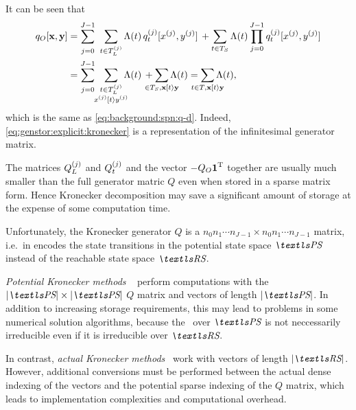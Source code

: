 It can be seen that
\begin{align}
  q_O[\vec{x}, \vec{y}]
  &= \sum_{\vphantom{\loc{T_L}{j}}j = 0}^{J - 1} \,\, \sum_{t \in
    \loc{T_L}{j}} \Lambda(t) \,
    \loc{q_t}{j}[\loc{x}{j}, \loc{y}{j}] \, + \sum_{t \in T_S} \Lambda(t)
    \prod_{\vphantom{T_S}j = 0}^{J - 1}
    \loc{q_t}{j}[\loc{x}{j}, \loc{y}{j}] \\
  &= \sum_{\vphantom{\loc{T_L}{j}}j = 0}^{J - 1} \,\,
    \sum_{\substack{\vphantom{\loc{T_L}{j}}t \in \loc{T_L}{j} \\
  \mathclap{\loc{x}{j} \tranto{t} \loc{y}{j}}}} \Lambda(t) \, +
  \sum_{\mathclap{\in T_S, \vec{x} \tranto{t} \vec{y}}} \Lambda(t)
  = \sum_{\mathclap{\vphantom{T_S}t \in T, \vec{x} \tranto{t}
  \vec{y}}} \Lambda(t) \text,
  \label{eq:genstor:explicit:block:qblock}
\end{align}
which is the same as \vref{eq:background:spn:q-d}. Indeed,
\cref{eq:genstor:explicit:kronecker} is a representation of the
infinitesimal generator matrix.

The matrices $Q_L^{(j)}$ and $Q_t^{(j)}$ and the vector
$-Q_O \bm{\mathrm{1}}^{\mathrm{T}}$ together are usually much smaller than the full
generator matric $Q$ even when stored in a sparse matrix form. Hence
Kronecker decomposition may save a significant amount of storage at
the expense of some computation time.

Unfortunately, the Kronecker generator $Q$ is a
$n_0 n_1 \cdots n_{J - 1} \times n_0 n_1 \cdots n_{J - 1}$ matrix,
i.e.~in encodes the state transitions in the potential state space
$\PS$ instead of the reachable state space $\RS$.

\emph{Potential Kronecker methods}%
~\citep{DBLP:journals/informs/BuchholzCDK00} perform computations with
the $\lvert \PS \rvert \times \lvert \PS \rvert$ $Q$ matrix and
vectors of length $\lvert \PS \rvert$. In addition to increasing
storage requirements, this may lead to problems in some numerical
solution algorithms, because the \CTMC\ over $\PS$ is not neccessarily
irreducible even if it is irreducible over $\RS$.

In contrast, \emph{actual Kronecker methods}~%
\citep{DBLP:journals/tse/Kemper96,%
  DBLP:journals/informs/BuchholzCDK00,%
  DBLP:journals/fgcs/BenoitPS06} work with vectors of length
$\lvert \RS \rvert$. However, additional conversions must be performed
between the actual dense indexing of the vectors and the potential
sparse indexing of the $Q$ matrix, which leads to implementation
complexities and computational overhead.

